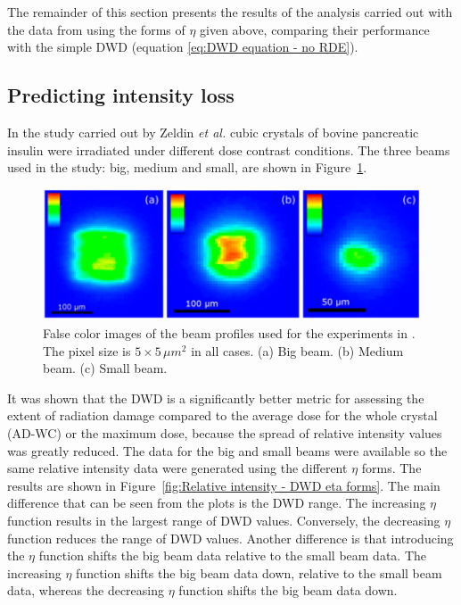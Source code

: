 The remainder of this section presents the results of the analysis carried out with the data from \cite{zeldin2013dwd} using the forms of $\eta$ given above, comparing their performance with the simple DWD (equation \ref{eq:DWD equation - no RDE}).

\subsection{Predicting intensity loss}
\label{sub:Predicting intensity loss}
In the study carried out by Zeldin \textit{et al.} \cite{zeldin2013dwd} cubic crystals of bovine pancreatic insulin were irradiated under different dose contrast conditions.
The three beams used in the study: big, medium and small, are shown in Figure~\ref{fig:Big, medium and small beams - Oli experiment}.
\begin{figure}
  \centering
    \includegraphics[width=1\textwidth]{figures/dwd/Oli_beams.png}
    \caption{False color images of the beam profiles used for the experiments in \cite{zeldin2013dwd}. The pixel size is $\text{5} \times \text{5}\,\mu m^2$ in all cases. (a) Big beam. (b) Medium beam. (c) Small beam.}
    \label{fig:Big, medium and small beams - Oli experiment}
\end{figure}
It was shown that the DWD is a significantly better metric for assessing the extent of radiation damage compared to the average dose for the whole crystal (AD-WC) or the maximum dose, because the spread of relative intensity values was greatly reduced.
The data for the big and small beams were available so the same relative intensity data were generated using the different $\eta$ forms.
The results are shown in Figure~\ref{fig:Relative intensity - DWD eta forms}.
The main difference that can be seen from the plots is the DWD range.
The increasing $\eta$ function results in the largest range of DWD values.
Conversely, the decreasing $\eta$ function reduces the range of DWD values.
Another difference is that introducing the $\eta$ function shifts the big beam data relative to the small beam data.
The increasing $\eta$ function shifts the big beam data down, relative to the small beam data, whereas the decreasing $\eta$ function shifts the big beam data down.
